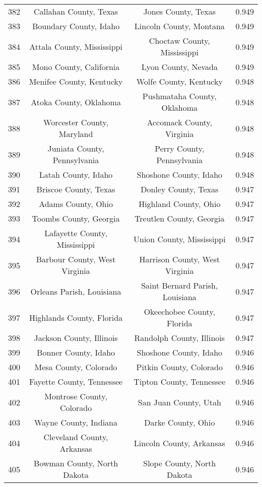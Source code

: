 \begin{longtable}{cccc}
  382 & Callahan County, Texas & Jones County, Texas & 0.949 \\ 
  383 & Boundary County, Idaho & Lincoln County, Montana & 0.949 \\ 
  384 & Attala County, Mississippi & Choctaw County, Mississippi & 0.949 \\ 
  385 & Mono County, California & Lyon County, Nevada & 0.949 \\ 
  386 & Menifee County, Kentucky & Wolfe County, Kentucky & 0.948 \\ 
  387 & Atoka County, Oklahoma & Pushmataha County, Oklahoma & 0.948 \\ 
  388 & Worcester County, Maryland & Accomack County, Virginia & 0.948 \\ 
  389 & Juniata County, Pennsylvania & Perry County, Pennsylvania & 0.948 \\ 
  390 & Latah County, Idaho & Shoshone County, Idaho & 0.948 \\ 
  391 & Briscoe County, Texas & Donley County, Texas & 0.947 \\ 
  392 & Adams County, Ohio & Highland County, Ohio & 0.947 \\ 
  393 & Toombs County, Georgia & Treutlen County, Georgia & 0.947 \\ 
  394 & Lafayette County, Mississippi & Union County, Mississippi & 0.947 \\ 
  395 & Barbour County, West Virginia & Harrison County, West Virginia & 0.947 \\ 
  396 & Orleans Parish, Louisiana & Saint Bernard Parish, Louisiana & 0.947 \\ 
  397 & Highlands County, Florida & Okeechobee County, Florida & 0.947 \\ 
  398 & Jackson County, Illinois & Randolph County, Illinois & 0.947 \\ 
  399 & Bonner County, Idaho & Shoshone County, Idaho & 0.946 \\ 
  400 & Mesa County, Colorado & Pitkin County, Colorado & 0.946 \\ 
  401 & Fayette County, Tennessee & Tipton County, Tennessee & 0.946 \\ 
  402 & Montrose County, Colorado & San Juan County, Utah & 0.946 \\ 
  403 & Wayne County, Indiana & Darke County, Ohio & 0.946 \\ 
  404 & Cleveland County, Arkansas & Lincoln County, Arkansas & 0.946 \\ 
  405 & Bowman County, North Dakota & Slope County, North Dakota & 0.946 \\ 

\end{longtable}
